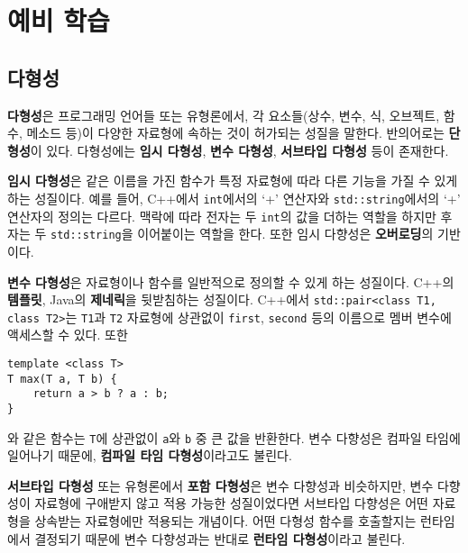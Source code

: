 \newpage

\section{예비 학습}

\subsection{다형성}
\textbf{다형성}은 프로그래밍 언어들 또는 유형론에서, 각 요소들(상수, 변수, 식, 오브젝트, 함수, 메소드 등)이 다양한 자료형에 속하는 것이 허가되는 성질을 말한다. 반의어로는 \textbf{단형성}이 있다. 다형성에는 \textbf{임시 다형성}, \textbf{변수 다형성}, \textbf{서브타입 다형성} 등이 존재한다.

\textbf{임시 다형성}은 같은 이름을 가진 함수가 특정 자료형에 따라 다른 기능을 가질 수 있게 하는 성질이다. 예를 들어, C++에서 \texttt{int}에서의 `+' 연산자와 \texttt{std::string}에서의 `+' 연산자의 정의는 다르다. 맥락에 따라 전자는 두 \texttt{int}의 값을 더하는 역할을 하지만 후자는 두 \texttt{std::string}을 이어붙이는 역할을 한다. 또한 임시 다향성은 \textbf{오버로딩}의 기반이다.

\textbf{변수 다형성}은 자료형이나 함수를 일반적으로 정의할 수 있게 하는 성질이다. C++의 \textbf{템플릿}, Java의 \textbf{제네릭}을 뒷받침하는 성질이다. C++에서 \texttt{std::pair<class T1, class T2>}는 \texttt{T1}과 \texttt{T2} 자료형에 상관없이 \texttt{first}, \texttt{second} 등의 이름으로 멤버 변수에 액세스할 수 있다. 또한
\begin{verbatim}
template <class T>
T max(T a, T b) {
    return a > b ? a : b;
}
\end{verbatim}
	와 같은 함수는 \texttt{T}에 상관없이 \texttt{a}와 \texttt{b} 중 큰 값을 반환한다. 변수 다향성은 컴파일 타임에 일어나기 때문에, \textbf{컴파일 타임 다형성}이라고도 불린다.
	
\textbf{서브타입 다형성} 또는 유형론에서 \textbf{포함 다형성}은 변수 다향성과 비슷하지만, 변수 다향성이 자료형에 구애받지 않고 적용 가능한 성질이었다면 서브타입 다향성은 어떤 자료형을 상속받는 자료형에만 적용되는 개념이다. 어떤 다형성 함수를 호출할지는 런타임에서 결정되기 때문에 변수 다향성과는 반대로 \textbf{런타임 다형성}이라고 불린다.

